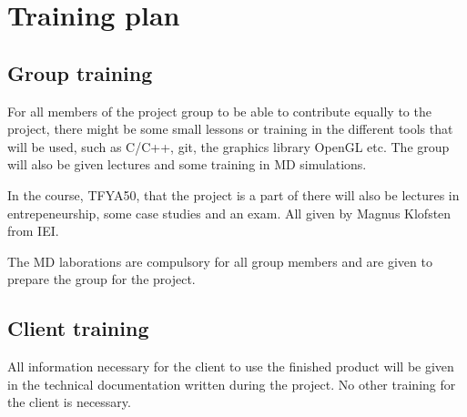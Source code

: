 \section{Training plan}

\subsection{Group training}
For all members of the project group to be able to contribute equally to the project, there might be some small lessons or training in the different tools that will be used, such as C/C++, git, the graphics library OpenGL etc. The group will also be given lectures and some training in MD simulations.

In the course, TFYA50, that the project is a part of there will also be lectures in entrepeneurship, some case studies and an exam. All given by Magnus Klofsten from IEI.

The MD laborations are compulsory for all group members and are given to prepare the group for the project.

\subsection{Client training}
All information necessary for the client to use the finished product will be given in the technical documentation written during the project. No other training for the client is necessary.
